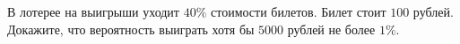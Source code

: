 В лотерее на выигрыши уходит $40 \%$ стоимости билетов. Билет стоит $100$ рублей. Докажите, что вероятность выиграть хотя бы
$5000$ рублей не более $1 \%$.